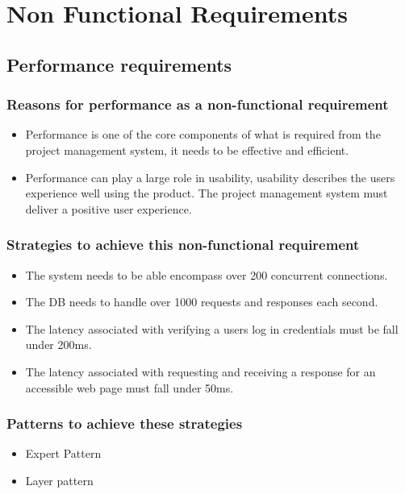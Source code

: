\documentclass[]{article}
\begin{document}
\thispagestyle{empty}\selectfont	
	\tableofcontents
	\clearpage
\section{Non Functional Requirements}
 \subsection{Performance requirements}
    \subsubsection{Reasons for performance as a non-functional requirement}
    \begin{itemize}
        \item Performance is one of the core components of what is required from the project management system, it needs to be effective and efficient.
        
        \item Performance can play a large role in usability, usability describes the users experience well using the product. The project management system must deliver a positive user experience. 
    \end{itemize}
    
    \subsubsection{Strategies to achieve this non-functional requirement}
    \begin{itemize}
        \item The system needs to be able encompass over 200 concurrent connections.
        
        \item The DB needs to handle over 1000 requests and responses each second.
        
        \item The latency associated with verifying a users log in credentials must be fall under 200ms. 
        
        \item The latency associated with requesting and receiving a response for an accessible web page must fall under 50ms.
    \end{itemize}
    \subsubsection{Patterns to achieve these strategies}
    \begin{itemize}
        \item Expert Pattern
        \item Layer pattern
    \end{itemize}
    
\end{document}
